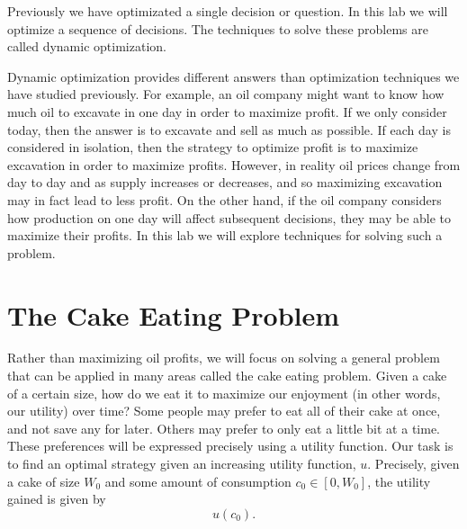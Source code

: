 \newcommand\ve{\varepsilon}


Previously we have optimizated a single decision or question.
In this lab we will optimize a sequence of decisions.
The techniques to solve these problems are called dynamic optimization.

Dynamic optimization provides different answers than optimization techniques we have studied previously.
For example, an oil company might want to know how much oil to excavate in one day in order to maximize profit.
If we only consider today, then the answer is to excavate and sell as much as possible.
If each day is considered in isolation, then the strategy to optimize profit is to maximize excavation in order to maximize profits.
However, in reality oil prices change from day to day and as supply increases or decreases, and so maximizing excavation may in fact lead to less profit.
On the other hand, if the oil company considers how production on one day will affect subsequent decisions, they may be able to maximize their profits.
In this lab we will explore techniques for solving such a problem.

\section*{The Cake Eating Problem}

Rather than maximizing oil profits, we will focus on solving a general problem that can be applied in many areas called the cake eating problem.
Given a cake of a certain size, how do we eat it to maximize our enjoyment (in other words, our utility) over time?
Some people may prefer to eat all of their cake at once, and not save any for later.
Others may prefer to only eat a little bit at a time.
These preferences will be expressed precisely using a utility function.
Our task is to find an optimal strategy given an increasing utility function, $u$.
Precisely, given a cake of size $W_0$ and some amount of consumption $c_0 \in [0, W_0]$, the utility gained is given by
\[
u(c_0).
\]

